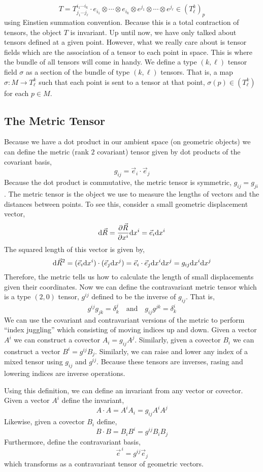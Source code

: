 \documentclass[11pt, a4paper]{article}
\begin{document}
\[ T = T^{i_1 \cdots i_k}_{j_1 \cdots j_\ell} \cdot e_{i_1} \otimes \cdots \otimes e_{i_{k}} \otimes e^{j_1} \otimes \cdots \otimes e^{j_{\ell}} \in (T^{k}_{\ell})_p\]
using Einstien summation convention. Because this is a total contraction of tensors, the object $T$ is invariant. Up until now, we have only talked about tensors defined at a given point. However, what we really care about is tensor fields which are the association of a tensor to each point in space. This is where the bundle of all tensors will come in handy. We define a type $(k, \ell)$ tensor field $\sigma$ as a section of the bundle  of type $(k, \ell)$ tensors. That is, a map $\sigma : M  \to T^k_{\ell}$ such that each point is sent to a tensor at that point, $\sigma(p) \in (T^k_{\ell})$ for each $p \in M$.

\subsection{The Metric Tensor}

Because we have a dot product in our ambient space (on geometric objects) we can define the metric (rank $2$ covariant) tensor given by dot products of the covariant basis,
\[ g_{ij} = \vec{e}_i \cdot \vec{e}_j \]
Because the dot product is commutative, the metric tensor is symmetric, $g_{ij} = g_{ji}$.
The metric tensor is the object we use to measure  the lengths of vectors and the distances between points. To see this, consider a small geometric displacement vector,
\[
\mathrm{d}\vec{R} = \frac{\partial{\vec{R}}}{\partial{x^i}} \mathrm{d}x^i = \vec{e}_i \mathrm{d}x^i
\]
The squared length of this vector is given by,
\[ \mathrm{d}\vec{R}^2 = (\vec{e}_i \mathrm{d}x^i) \cdot (\vec{e}_j \mathrm{d}x^j) = \vec{e}_i \cdot \vec{e}_j \mathrm{d}x^i \mathrm{d}x^j = g_{ij} \mathrm{d}x^i \mathrm{d}x^j \]
Therefore, the metric tells us how to calculate the length of small displacements given their coordinates. Now we can define the contravariant metric tensor which is a type $(2,0)$ tensor, $g^{ij}$ defined to be the inverse of $g_{ij}$. That is,
\[ g^{ij} g_{j k} = \delta^{j}_{k} \quad \text{and} \quad g_{ij} g^{jk} = \delta^{i}_{k}\]
We can use the covariant and contravariant versions of the metric to perform ``index juggling'' which consisting of moving indices up and down. Given a vector $A^i$ we can construct a covector $A_i = g_{ij} A^j$. Similarly, given a covector $B_i$ we can construct a vector $B^i = g^{ij} B_j$. Similarly, we can raise and lower any index of a mixed tensor using $g_{ij}$ and $g^{ij}$. Because these tensors are inverses, rasing and lowering indices are inverse operations. 
\par
Using this definition, we can define an invariant from any vector or covector. Given a vector $A^i$ define the invariant,
\[A \cdot A = A^i A_i = g_{ij} A^{i} A^{j}\] Likewise, given a covector $B_i$ define,
\[ B \cdot B = B_i B^i = g^{ij} B_i B_j \] 
Furthermore, define the contravariant basis,
\[ \vec{e}^{\, i} = g^{ij} \vec{e}_j \]
which transforms as a contravariant tensor of geometric vectors.
\end{document}

